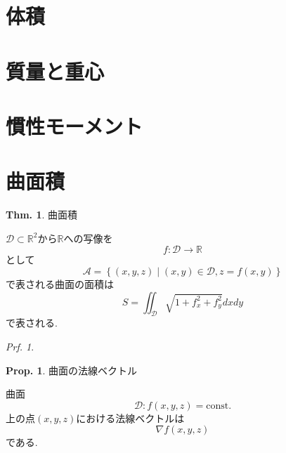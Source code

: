 \documentclass[a4paper,10pt,report]{amsart}
\theoremstyle{plain}
\theoremstyle{definition}
\newtheorem{thm}{Thm.}[section]
\newtheorem{prop}{Prop.}[section]
\theoremstyle{remark}
\newtheorem{prf}{Prf.}
\begin{document}
    \section{体積}
    \section{質量と重心}
    \section{慣性モーメント}
    \section{曲面積}
    \begin{leftbar}
        \begin{thm}曲面積\par
            \(\mathcal{D}\subset\mathbb{R}^{2}\)から\(\mathbb{R}\)への写像を
            \begin{equation}
                f:\mathcal{D}\to \mathbb{R}
            \end{equation}
            として
            \begin{equation}
                \mathcal{A}=\left \{(x,y,z)\middle|(x,y)\in\mathcal{D},z=f(x,y)\right \}
            \end{equation}
            で表される曲面の面積は
            \begin{equation}
                S=\iint_{\mathcal{D}}\sqrt{1+f_{x}^{2}+f_{y}^{2}}dxdy
            \end{equation}
            で表される. 
        \end{thm}
    \end{leftbar}
    \begin{prf}
        
    \end{prf}
    \begin{leftbar}
        \begin{prop}曲面の法線ベクトル\par
            曲面
            \begin{equation*}
                \mathcal{D}:f(x,y,z)=\mathrm{const.}
            \end{equation*}
            上の点\((x,y,z)\)における法線ベクトルは
            \begin{equation}
                \nabla f(x,y,z)
            \end{equation}
            である.
        \end{prop}
    \end{leftbar}
\end{document}
